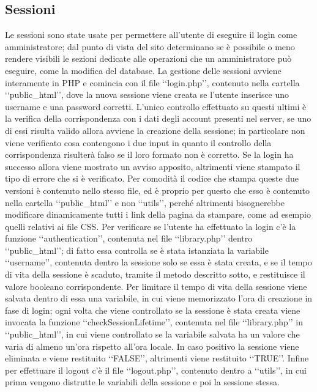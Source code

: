 {	\subsection{Sessioni}{
		Le sessioni sono state usate per permettere all'utente di eseguire il login come amministratore; dal punto di vista del sito determinano se è possibile o meno rendere visibili le sezioni dedicate alle operazioni che un amministratore può eseguire, come la modifica del database. La gestione delle sessioni avviene interamente in PHP e comincia con il file ‘‘login.php’’, contenuto nella cartella ‘‘public_html’’, dove la nuova sessione viene creata se l'utente inserisce uno username e una password corretti. L'unico controllo effettuato su questi ultimi è la verifica della corrispondenza con i dati degli account presenti nel server, se uno di essi risulta valido allora avviene la creazione della sessione; in particolare non viene verificato cosa contengono i due input in quanto il controllo della corrispondenza risulterà falso se il loro formato non è corretto. Se la login ha successo allora viene mostrato un avviso apposito, altrimenti viene stampato il tipo di errore che si è verificato. Per comodità il codice che stampa queste due versioni è contenuto nello stesso file, ed è proprio per questo che esso è contenuto nella cartella ‘‘public_html’’ e non ‘‘utils’’, perché altrimenti bisognerebbe modificare dinamicamente tutti i link della pagina da stampare, come ad esempio quelli relativi ai file CSS.
		Per verificare se l'utente ha effettuato la login c'è la funzione ‘‘authentication’’, contenuta nel file ‘‘library.php’’ dentro ‘‘public_html’’; di fatto essa controlla se è stata istanziata la variabile ‘‘username’’, contenuta dentro la sessione solo se essa è stata creata, e se il tempo di vita della sessione è scaduto, tramite il metodo descritto sotto, e restituisce il valore booleano corrispondente.
		Per limitare il tempo di vita della sessione viene salvata dentro di essa una variabile, in cui viene memorizzato l'ora di creazione in fase di login; ogni volta che viene controllato se la sessione è stata creata viene invocata la funzione ‘‘checkSessionLifetime’’, contenuta nel file ‘‘library.php’’ in ‘‘public_html’’, in cui viene controllato se la variabile salvata ha un valore che varia di almeno un'ora rispetto all'ora locale. In caso positivo la sessione viene eliminata e viene restituito ‘‘FALSE’’, altrimenti viene restituito ‘‘TRUE’’.
		Infine per effettuare il logout c'è il file ‘‘logout.php’’, contenuto dentro a ‘‘utils’’, in cui prima vengono distrutte le variabili della sessione e poi la sessione stessa.
	}
}